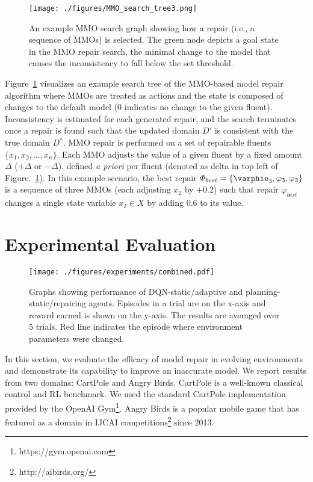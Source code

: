 \documentclass[letterpaper]{article} %
\begin{document}
\begin{figure}
	\centering
	\texttt{[image: ./figures/MMO\_search\_tree3.png]}
	\caption{An example MMO search graph showing how a repair (i.e., a sequence of MMOs) is selected. The green node depicts a goal state in the MMO repair search, the minimal change to the model that causes the inconsistency to fall below the set threshold.}
	\label{fig:mmo_search}
\end{figure}

Figure~\ref{fig:mmo_search} visualizes an example search tree of the MMO-based model repair algorithm where MMOs are treated as actions and the state is composed of changes to the default model (0 indicates no change to the given fluent). Inconsistency is estimated for each generated repair, and the search terminates once a repair is found such that the updated domain $D'$ is consistent with the true domain $D^*$. MMO repair is performed on a set of repairable fluents $\{x_1, x_2, ..., x_n\}$. Each MMO adjusts the value of a given fluent by a fixed amount $\Delta$ ($+\Delta$ or $-\Delta$), defined \emph{a priori} per fluent (denoted as delta in top left of Figure.~\ref{fig:mmo_search}). In this example scenario, the best repair $\varPhi_{best} = \{\varphie_3, \varphi_3, \varphi_3\}$ is a sequence of three MMOs (each adjusting $x_2$ by $+0.2$) such that repair $\varphi_{best}$ changes a single state variable $x_2 \in X$ by adding $0.6$ to its value.



\section{Experimental Evaluation}
\begin{figure*}
    \centering
    \texttt{[image: ./figures/experiments/combined.pdf]}
    \caption{Graphs showing performance of DQN-static/adaptive and planning-static/repairing agents. Episodes in a trial are on the x-axis and reward earned is shown on the y-axis. The results are averaged over $5$ trials. Red line indicates the episode where environment parameters were changed.}
    \label{fig:combined_results}
\end{figure*}
In this section, we evaluate the efficacy of model repair in evolving environments and demonstrate its capability to improve an inaccurate model. We report results from two domains: CartPole and Angry Birds. CartPole is a well-known classical control and RL benchmark. We used the standard CartPole implementation provided by the OpenAI Gym\footnote{https://gym.openai.com}. Angry Birds is a popular mobile game that has featured as a domain in IJCAI competitions\footnote{http://aibirds.org/} since 2013.
\end{document}
